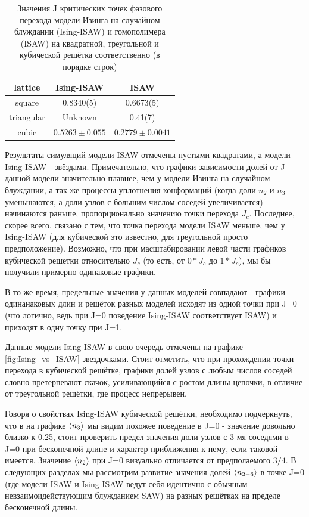\begin{table}[h!]
    \centering
    \begin{tabular}{|c|c|c|}
        \hline
        lattice & Ising-ISAW & ISAW \\ \hline
        square & 0.8340(5)\cite{faizullina2021critical} &  0.6673(5)\cite{caracciolo2011geometrical} \\ \hline
        triangular & Unknown & 0.41(7) \cite{Privman1986}\\ \hline
        cubic & $0.5263 \pm 0.055$\cite{foster2021critical} & $0.2779 \pm 0.0041$\cite{Tesi1996} \\ \hline
    \end{tabular}
    \caption{Значения J критических точек фазового перехода модели Изинга на случайном блуждании (Ising-ISAW) и гомополимера (ISAW) на квадратной, треугольной и кубической решётка соответственно (в порядке строк)}
    \label{tab:crits}
\end{table}

Результаты симуляций модели ISAW отмечены пустыми квадратами, а модели Ising-ISAW - звёздами. Примечательно, что графики зависимости долей от J данной модели значительно плавнее, чем у модели Изинга на случайном блуждании, а так же процессы уплотнения конформаций (когда доли $n_{2}$ и $n_{3}$ уменьшаются, а доли узлов с большим числом соседей увеличивается) начинаются раньше, пропорционально значению точки перехода $J_{c}$. Последнее, скорее всего, связано с тем, что точка перехода модели ISAW меньше, чем у Ising-ISAW (для кубической это известно, для треугольной просто предположение). Возможно, что при масштабировании левой части графиков кубической решетки относительно $J_{c}$ (то есть, от $0*J_{c}$ до $1*J_{c}$), мы бы получили примерно одинаковые графики.

В то же время, предельные значения у данных моделей совпадают - графики одинанаковых длин и решёток разных моделей исходят из одной точки при J=0 (что логично, ведь при J=0 поведение Ising-ISAW соответствует ISAW) и приходят в одну точку при J=1.

Данные модели Ising-ISAW в свою очередь отмечены на графике \ref{fig:Ising_vs_ISAW} звездочками. Стоит отметить, что при прохождении точки перехода в кубической решётке, графики долей узлов с любым числов соседей словно претерпевают скачок, усиливающийся с ростом длины цепочки, в отличие от треугольной решётки, где процесс непрерывен.

Говоря о свойствах Ising-ISAW кубической решётки, необходимо подчеркнуть, что в на графике $\langle n_{3} \rangle$ мы видим похожее поведение в J=0 - значение довольно близко к 0.25, стоит проверить предел значения доли узлов с 3-мя соседями в J=0 при бесконечной длине и характер приближения к нему, если таковой имеется. Значение $\langle n_{2} \rangle$ при J=0 визуально отличается от предполаемого $3/4$. В следующих разделах мы рассмотрим развитие значения долей $\langle n_{2-6} \rangle$ в точке J=0 (где модели ISAW и Ising-ISAW ведут себя идентично с обычным невзаимоидействующим блужданием SAW) на разных решётках на пределе бесконечной длины.

